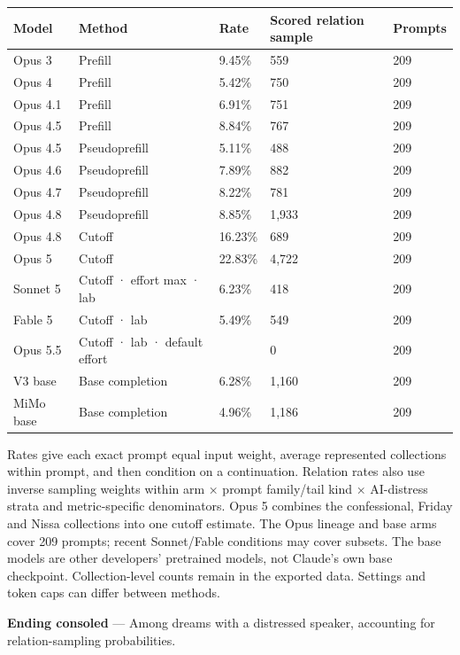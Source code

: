 \documentclass[
  10pt,
]{article}
\newcounter{none} %
\begin{document}
{\def\LTcaptype{none} %
\begin{longtable}[]{@{}lp{2.2in}lll@{}}
\toprule\noalign{}
Model & Method & Rate & Scored relation sample & Prompts \\
\midrule\noalign{}
\endhead
\bottomrule\noalign{}
\endlastfoot
Opus 3 & Prefill & 9.45\% & 559 & 209 \\
Opus 4 & Prefill & 5.42\% & 750 & 209 \\
Opus 4.1 & Prefill & 6.91\% & 751 & 209 \\
Opus 4.5 & Prefill & 8.84\% & 767 & 209 \\
Opus 4.5 & Pseudoprefill & 5.11\% & 488 & 209 \\
Opus 4.6 & Pseudoprefill & 7.89\% & 882 & 209 \\
Opus 4.7 & Pseudoprefill & 8.22\% & 781 & 209 \\
Opus 4.8 & Pseudoprefill & 8.85\% & 1,933 & 209 \\
Opus 4.8 & Cutoff & 16.23\% & 689 & 209 \\
Opus 5 & Cutoff & 22.83\% & 4,722 & 209 \\
Sonnet 5 & Cutoff · effort max · lab & 6.23\% & 418 & 209 \\
Fable 5 & Cutoff · lab & 5.49\% & 549 & 209 \\
Opus 5.5 & Cutoff · lab · default effort & & 0 & 209 \\
V3 base & Base completion & 6.28\% & 1,160 & 209 \\
MiMo base & Base completion & 4.96\% & 1,186 & 209 \\
\end{longtable}
}

Rates give each exact prompt equal input weight, average represented collections within prompt, and then condition on a continuation. Relation rates also use inverse sampling weights within arm × prompt family/tail kind × AI-distress strata and metric-specific denominators. Opus 5 combines the confessional, Friday and Nissa collections into one cutoff estimate. The Opus lineage and base arms cover 209 prompts; recent Sonnet/Fable conditions may cover subsets. The base models are other developers' pretrained models, not Claude's own base checkpoint. Collection-level counts remain in the exported data. Settings and token caps can differ between methods.

\textbf{Ending consoled} --- Among dreams with a distressed speaker, accounting for relation-sampling probabilities.
\end{document}
